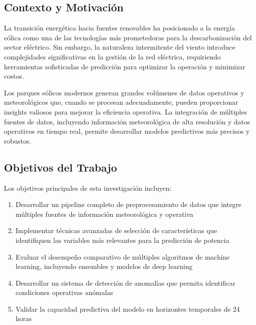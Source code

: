\documentclass[conference]{IEEEtran}
\begin{document}
	\subsection{Contexto y Motivación}
	La transición energética hacia fuentes renovables ha posicionado a la energía eólica como una de las tecnologías más prometedoras para la descarbonización del sector eléctrico. Sin embargo, la naturaleza intermitente del viento introduce complejidades significativas en la gestión de la red eléctrica, requiriendo herramientas sofisticadas de predicción para optimizar la operación y minimizar costos.
	
	Los parques eólicos modernos generan grandes volúmenes de datos operativos y meteorológicos que, cuando se procesan adecuadamente, pueden proporcionar insights valiosos para mejorar la eficiencia operativa. La integración de múltiples fuentes de datos, incluyendo información meteorológica de alta resolución y datos operativos en tiempo real, permite desarrollar modelos predictivos más precisos y robustos.
	
	\subsection{Objetivos del Trabajo}
	Los objetivos principales de esta investigación incluyen:
	\begin{enumerate}
		\item Desarrollar un pipeline completo de preprocesamiento de datos que integre múltiples fuentes de información meteorológica y operativa
		\item Implementar técnicas avanzadas de selección de características que identifiquen las variables más relevantes para la predicción de potencia
		\item Evaluar el desempeño comparativo de múltiples algoritmos de machine learning, incluyendo ensembles y modelos de deep learning
		\item Desarrollar un sistema de detección de anomalías que permita identificar condiciones operativas anómalas
		\item Validar la capacidad predictiva del modelo en horizontes temporales de 24 horas
	\end{enumerate}
	
\end{document}
